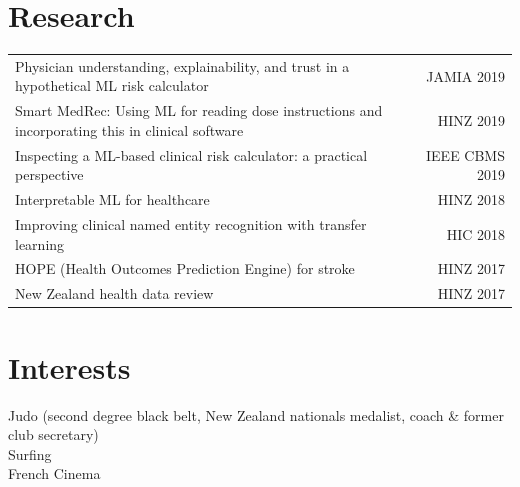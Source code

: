 \documentclass[letterpaper,11pt]{article}
\begin{document}
\section{Research} 
\begin{tabular*}{\textwidth}{l@{\extracolsep{\fill}}r}
Physician understanding, explainability, and trust in a hypothetical ML risk calculator & {\small JAMIA 2019}\\
Smart MedRec: Using ML for reading dose instructions and incorporating this in clinical software & {\small HINZ 2019}\\
Inspecting a ML-based clinical risk calculator: a practical perspective & {\small IEEE CBMS 2019}\\
Interpretable ML for healthcare & {\small HINZ 2018}\\
Improving clinical named entity recognition with transfer learning & {\small HIC 2018}\\
HOPE (Health Outcomes Prediction Engine) for stroke & {\small HINZ 2017}\\
New Zealand health data review & {\small HINZ 2017}\\
\end{tabular*}



\section{Interests}
Judo (second degree black belt, New Zealand nationals medalist, coach \& former club secretary)\\
Surfing\\
French Cinema
\end{document}
